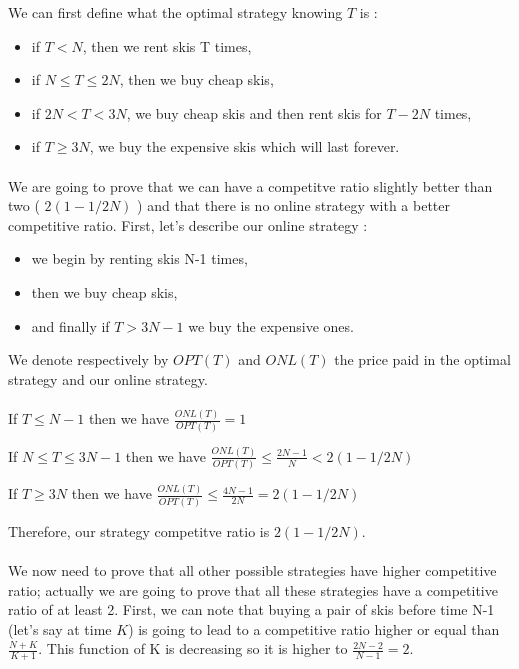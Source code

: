 We can first define what the optimal strategy knowing $T$ is :
\begin{itemize}
	\item if $T<N$, then we rent skis T times,
	\item if $N\leqslant T \leqslant 2N$, then we buy cheap skis,
	\item if $2N<T<3N$, we buy cheap skis and then rent skis for $T-2N$ times,
	\item if $T\geqslant 3N$, we buy the expensive skis which will last forever.
\end{itemize}

\paragraph{}
We are going to prove that we can have a competitve ratio slightly better than two ( $2(1-1/2N)$ ) and that there is no online strategy with a better competitive ratio.
First, let's describe our online strategy : 
\begin{itemize}
	\item we begin by renting skis N-1 times,
	\item then we buy cheap skis,
	\item and finally if $T>3N-1$ we buy the expensive ones.
\end{itemize}


We denote respectively by $OPT(T)$ and $ONL(T)$ the price paid in the optimal strategy and our online strategy.

\paragraph{}
If $T \leqslant N-1$ then we have $\frac{ONL(T)}{OPT(T)} = 1$

If $N\leqslant T\leqslant3N-1$ then we have $\frac{ONL(T)}{OPT(T)} \leqslant \frac{2N-1}{N} < 2(1-1/2N)$

If $T \geqslant 3N$ then we have $\frac{ONL(T)}{OPT(T)} \leqslant \frac{4N-1}{2N} = 2(1-1/2N)$

Therefore, our strategy competitve ratio is $2(1-1/2N)$. 
\paragraph{}
We now need to prove that all other possible strategies have higher competitive ratio; actually we are going to prove that all these strategies have a competitive ratio of at least 2. First, we can note that buying a pair of skis before time N-1 (let's say at time $K$) is going to lead to a competitive ratio higher or equal than $\frac{N+K}{K+1}$. This function of K is decreasing so it is higher to $\frac{2N-2}{N-1}=2$.

